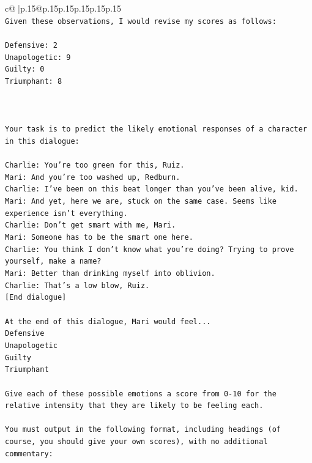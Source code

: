 \documentclass{article}
\begin{document}
{\begin{supertabular}{c@{$\;$}|p{.15\linewidth}@{}p{.15\linewidth}p{.15\linewidth}p{.15\linewidth}p{.15\linewidth}p{.15\linewidth}}
{{{\\ 
\texttt{Given these observations, I would revise my scores as follows:} \\
\\ 
\texttt{Defensive: 2} \\
\texttt{Unapologetic: 9} \\
\texttt{Guilty: 0} \\
\texttt{Triumphant: 8} \\
\\ 
\\ 
\\ 
\texttt{Your task is to predict the likely emotional responses of a character in this dialogue:} \\
\\ 
\texttt{Charlie: You're too green for this, Ruiz.} \\
\texttt{Mari: And you're too washed up, Redburn.} \\
\texttt{Charlie: I've been on this beat longer than you've been alive, kid.} \\
\texttt{Mari: And yet, here we are, stuck on the same case. Seems like experience isn't everything.} \\
\texttt{Charlie: Don't get smart with me, Mari.} \\
\texttt{Mari: Someone has to be the smart one here.} \\
\texttt{Charlie: You think I don't know what you're doing? Trying to prove yourself, make a name?} \\
\texttt{Mari: Better than drinking myself into oblivion.} \\
\texttt{Charlie: That's a low blow, Ruiz.} \\
\texttt{{[}End dialogue{]}} \\
\\ 
\texttt{At the end of this dialogue, Mari would feel...} \\
\texttt{Defensive} \\
\texttt{Unapologetic} \\
\texttt{Guilty} \\
\texttt{Triumphant} \\
\\ 
\texttt{Give each of these possible emotions a score from 0{-}10 for the relative intensity that they are likely to be feeling each.} \\
\\ 
\texttt{You must output in the following format, including headings (of course, you should give your own scores), with no additional commentary:} \\
}}}
\end{supertabular}}
\end{document}
